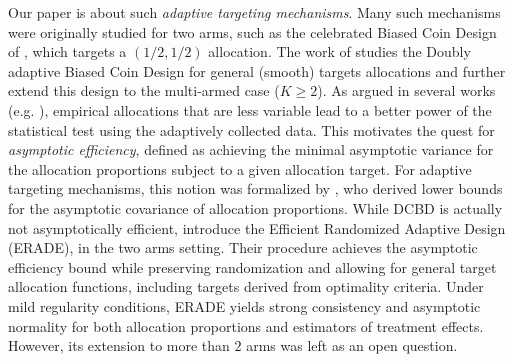 %
Our paper is about such \emph{adaptive targeting mechanisms}. Many such mechanisms were originally studied for two arms, such as the celebrated Biased Coin Design of \cite{Efron71BCD}, which targets a $(1/2,1/2)$ allocation. The work of \cite{hu2004asymptotic} studies the Doubly adaptive Biased Coin Design for general (smooth) targets allocations and further extend this design to the multi-armed case ($K \geq 2$). As argued in several works (e.g. \cite{HuRosenberger03VariabilityPower}), empirical allocations that are less variable lead to a better power of the statistical test using the adaptively collected data. This motivates the quest for \textit{asymptotic efficiency}, defined as achieving the minimal asymptotic variance for the allocation proportions subject to a given allocation target. For adaptive targeting mechanisms, this notion was formalized by \cite{hu2006asymptotically}, who derived lower bounds for the asymptotic covariance of allocation proportions. %
While DCBD is actually not asymptotically efficient, \cite{hu2009efficient} introduce the Efficient Randomized Adaptive Design (ERADE), in the two arms setting. Their procedure achieves the asymptotic efficiency bound while preserving randomization and allowing for general target allocation functions, including targets derived from optimality criteria. Under mild regularity conditions, ERADE yields strong consistency and asymptotic normality for both allocation proportions and estimators of treatment effects. However, its extension to more than $2$ arms was left as an open question.



